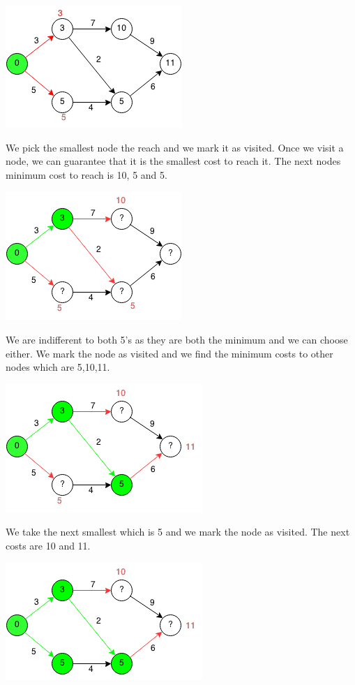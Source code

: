\documentclass[11pt,oneside]{book}
\makeatletter
\def\maxwidth#1{\ifdim\Gin@nat@width>#1 #1\else\Gin@nat@width\fi}
\makeatother
\begin{document}
\vspace{5px}\includegraphics[width=\maxwidth{\textwidth}]{djikstra1.png}

We pick the smallest node the reach and we mark it as visited. Once we visit a node, we can guarantee that it is the smallest cost to reach it. The next nodes minimum cost to reach is 10, 5 and 5.

\vspace{5px}\includegraphics[width=\maxwidth{\textwidth}]{djikstra2.png}

We are indifferent to both 5's as they are both the minimum and we can choose either. We mark the node as visited and we find the minimum costs to other nodes which are 5,10,11.

\vspace{5px}\includegraphics[width=\maxwidth{\textwidth}]{djikstra3.png}

We take the next smallest which is 5 and we mark the node as visited. The next costs are 10 and 11.

\vspace{5px}\includegraphics[width=\maxwidth{\textwidth}]{djikstra4.png}
\end{document}
